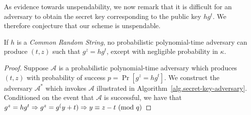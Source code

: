 As evidence towards unspendability, we now remark that it is difficult for an adversary to obtain the secret key corresponding to the public key $h g^t$. We therefore conjecture that our scheme is unspendable.

\begin{lemma}
  If $h$ is a \emph{Common Random String}, no probabilistic polynomial-time adversary can produce $(t, z)$ such that $g^z = h g^t$, except with negligible probability in $\kappa$.
\end{lemma}
\begin{proof}
  Suppose $\mathcal{A}$ is a probabilistic polynomial-time adversary which produces $(t, z)$ with probability of success $p = \Pr[g^z = h g^t]$.
  We construct the adversary $\mathcal{A}^*$ which invokes $\mathcal{A}$
  illustrated in Algorithm~\ref{alg.secret-key-adversary}.
  Conditioned on the event that $\mathcal{A}$ is successful,
  we have that
  $g^z = h g^t \Rightarrow g^z = g^(y + t) \Rightarrow y \equiv z - t \ (\mathrm{mod}\ q)$
\end{proof}
